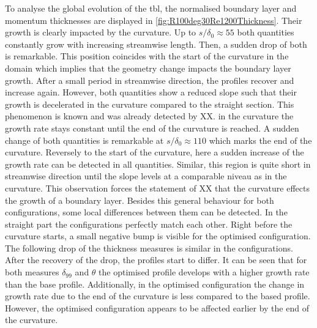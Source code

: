 To analyse the global evolution of the \acrshort{tbl}, the normalised boundary layer and momentum thicknesses are displayed in \autoref{fig:R100deg30Re1200Thickness}.
Their growth is clearly impacted by the curvature.
Up to $s/\delta_0 \approx 55$ both quantities constantly grow with increasing streamwise length.
Then, a sudden drop of both is remarkable. 
This position coincides with the start of the curvature in the domain which implies that the geometry change impacts the boundary layer growth.
After a small period in streamwise direction, the profiles recover and increase again. 
However, both quantities show a reduced slope such that their growth is decelerated in the curvature compared to the straight section.
This phenomenon is known and was already detected by XX.
in the curvature the growth rate stays constant until the end of the curvature is reached.
A sudden change of both quantities is remarkable at $s/\delta_0 \approx 110$ which marks the end of the curvature.
Reversely to the start of the curvature, here a sudden increase of the growth rate can be detected in all quantities.
Similar, this region is quite short in streamwise direction until the slope levels at a comparable niveau as in the curvature.
This observation forces the statement of XX that the curvature effects the growth of a boundary layer.
Besides this general behaviour for both configurations, some local differences between them can be detected.
In the straight part the configurations perfectly match each other. 
Right before the curvature starts, a small negative bump is visible for the optimised configuration.
The following drop of the thickness measures is similar in the configurations.
After the recovery of the drop, the profiles start to differ.
It can be seen that for both measures $\delta_{99}$ and $\theta$ the optimised profile develops with a higher growth rate than the base profile.
Additionally, in the optimised configuration the change in growth rate due to the end of the curvature is less compared to the based profile.
However, the optimised configuration appears to be affected earlier by the end of the curvature.


